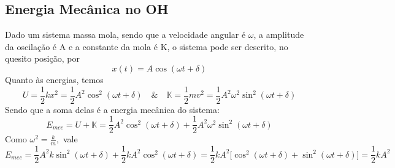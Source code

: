 \documentclass[PhysicsII/physicsII_notes.tex]{subfiles}
\begin{document}
\subsection{Energia Mecânica no OH}
Dado um sistema massa mola, sendo que a velocidade angular é \(\omega \), a amplitude da oscilação é A e a constante da mola é K, o sistema pode ser
descrito, no quesito posição, por
\[
	x(t) = A\cos{(\omega t + \delta )}
\]
Quanto às energias, temos
\[
	U = \frac{1}{2}kx^{2} = \frac{1}{2}A^{2}\cos^{2}{(\omega t + \delta )}\quad\&\quad \mathbb{K} = \frac{1}{2}mv^{2} = \frac{1}{2}A^{2}\omega ^{2}\sin^{2}{(\omega t+\delta )}
\]
Sendo que a soma delas é a energia mecânica do sistema:
\[
	E_{mec} = U + \mathbb{K} = \frac{1}{2}A^{2}\cos^{2}{(\omega t + \delta )} + \frac{1}{2}A^{2}\omega ^{2}\sin^{2}{(\omega t+\delta )}
\]
Como \(\omega^{2} = \frac{k}{m},\) vale
\[
	E_{mec} = \frac{1}{2}A^{2}k\sin^{2}{(\omega t + \delta )} + \frac{1}{2}kA^{2}\cos^{2}{(\omega t + \delta )} = \frac{1}{2}kA^{2}\biggl[\cos^{2}{(\omega t+\delta )} + \sin^{2}{(\omega t + \delta )}\biggr] = \frac{1}{2}kA^{2}
\]
\end{document}
